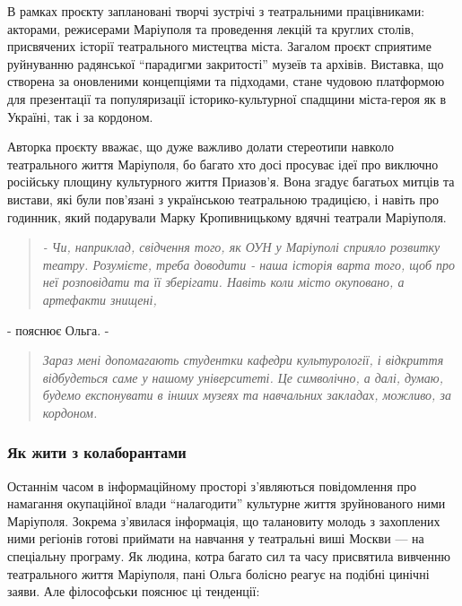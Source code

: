 В рамках проєкту заплановані творчі зустрічі з театральними працівниками:
акторами, режисерами Маріуполя та проведення лекцій та круглих столів,
присвячених історії театрального мистецтва міста. Загалом проєкт сприятиме
руйнуванню радянської \enquote{парадигми закритості} музеїв та архівів. Виставка, що
створена за оновленими концепціями та підходами, стане чудовою платформою для
презентації та популяризації історико-культурної спадщини міста-героя як в
Україні, так і за кордоном. 

Авторка проєкту вважає, що дуже важливо долати стереотипи навколо театрального
життя Маріуполя, бо багато хто досі просуває ідеї про виключно російську
площину культурного життя Приазов'я. Вона згадує багатьох митців та вистави,
які були пов'язані з українською театральною традицією, і навіть про годинник,
який подарували Марку Кропивницькому вдячні театрали Маріуполя.


\begin{quote}
\em - Чи, наприклад, свідчення того, як ОУН у Маріуполі сприяло розвитку театру.
Розумієте, треба доводити - наша історія варта того, щоб про неї розповідати та
її зберігати. Навіть коли місто окуповано, а артефакти знищені, 
\end{quote}
- пояснює Ольга. - 
\begin{quote}
\em Зараз мені допомагають студентки кафедри культурології, і відкриття
відбудеться саме у нашому університеті. Це символічно, а далі, думаю, будемо
експонувати в інших музеях та навчальних закладах, можливо, за кордоном.
\end{quote}

\subsubsection{Як жити з колаборантами}

Останнім часом в інформаційному просторі з'являються повідомлення про намагання
окупаційної влади \enquote{налагодити} культурне життя зруйнованого ними Маріуполя.
Зокрема з'явилася інформація, що талановиту молодь з захоплених ними регіонів
готові приймати на навчання у театральні виші Москви — на спеціальну програму.
Як людина, котра багато сил та часу присвятила вивченню театрального життя
Маріуполя, пані Ольга болісно реагує на подібні цинічні заяви. Але філософськи
пояснює ці тенденції: 

